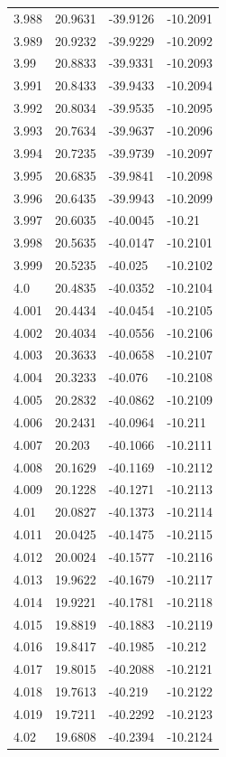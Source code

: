 \begin{tabular}{llll}
3.988 & 20.9631 & -39.9126 & -10.2091 \\
3.989 & 20.9232 & -39.9229 & -10.2092 \\
3.99 & 20.8833 & -39.9331 & -10.2093 \\
3.991 & 20.8433 & -39.9433 & -10.2094 \\
3.992 & 20.8034 & -39.9535 & -10.2095 \\
3.993 & 20.7634 & -39.9637 & -10.2096 \\
3.994 & 20.7235 & -39.9739 & -10.2097 \\
3.995 & 20.6835 & -39.9841 & -10.2098 \\
3.996 & 20.6435 & -39.9943 & -10.2099 \\
3.997 & 20.6035 & -40.0045 & -10.21 \\
3.998 & 20.5635 & -40.0147 & -10.2101 \\
3.999 & 20.5235 & -40.025 & -10.2102 \\
4.0 & 20.4835 & -40.0352 & -10.2104 \\
4.001 & 20.4434 & -40.0454 & -10.2105 \\
4.002 & 20.4034 & -40.0556 & -10.2106 \\
4.003 & 20.3633 & -40.0658 & -10.2107 \\
4.004 & 20.3233 & -40.076 & -10.2108 \\
4.005 & 20.2832 & -40.0862 & -10.2109 \\
4.006 & 20.2431 & -40.0964 & -10.211 \\
4.007 & 20.203 & -40.1066 & -10.2111 \\
4.008 & 20.1629 & -40.1169 & -10.2112 \\
4.009 & 20.1228 & -40.1271 & -10.2113 \\
4.01 & 20.0827 & -40.1373 & -10.2114 \\
4.011 & 20.0425 & -40.1475 & -10.2115 \\
4.012 & 20.0024 & -40.1577 & -10.2116 \\
4.013 & 19.9622 & -40.1679 & -10.2117 \\
4.014 & 19.9221 & -40.1781 & -10.2118 \\
4.015 & 19.8819 & -40.1883 & -10.2119 \\
4.016 & 19.8417 & -40.1985 & -10.212 \\
4.017 & 19.8015 & -40.2088 & -10.2121 \\
4.018 & 19.7613 & -40.219 & -10.2122 \\
4.019 & 19.7211 & -40.2292 & -10.2123 \\
4.02 & 19.6808 & -40.2394 & -10.2124 \\

\end{tabular}

